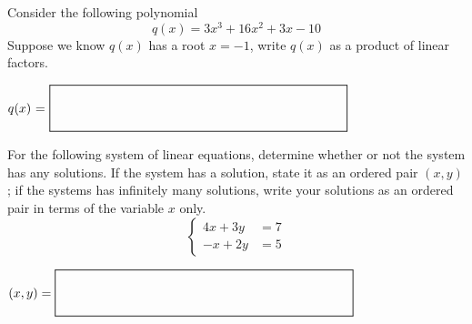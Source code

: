 \documentclass[addpoints,12pt]{exam}
\newcommand*{\Scale}[2][4]{\scalebox{#1}{\ensuremath{#2}}}%
\newcommand{\chooseone}{{\Large$\Circle$\ \ }}
\begin{document}
\begin{questions}
\newpage

\question[8] Consider the following polynomial 
\[ q(x)= 3x^3+16x^2+3x-10\]
Suppose we know $q(x)$ has a root $x=-1$, write $q(x)$ as a product of linear factors.
\vfill

\begin{center}
$
                \mbox{$q(x)$ = } \Scale[1.5]{\boxed{ \phantom{\dfrac{a}{b}} \hspace{5cm} }}
            $
\end{center}

\newpage
\question[8]
For the following system of linear equations, determine whether or not the system has any solutions. If the system has a solution, state it as an ordered pair $(x,y)$; if the systems has infinitely many solutions, write your solutions as an ordered pair in terms of the variable $x$ only.
$$\begin{cases}
4 x  +  3 y & = 7 \\
- x  +  2 y & = 5
\end{cases}$$
\vfill
\begin{center}
    

$
                (x,y) = \Scale[1.5]{\boxed{ \phantom{\dfrac{a}{b}} \hspace{5cm} }}
            $
            \end{center}

\end{questions}
\end{document}
